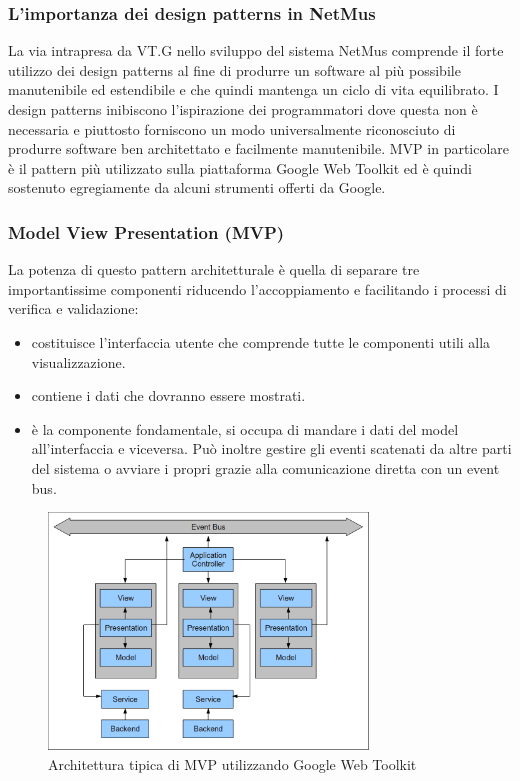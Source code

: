 \subsubsection{L'importanza dei design patterns in NetMus}
La via intrapresa da VT.G nello sviluppo del sistema NetMus comprende il forte
utilizzo dei design patterns al fine di produrre un software al pi\`u
possibile manutenibile ed estendibile e che quindi mantenga un ciclo di
vita equilibrato. 
I design patterns inibiscono l'ispirazione dei programmatori dove
questa non \`e necessaria e piuttosto forniscono un modo universalmente
riconosciuto di produrre software ben architettato e facilmente manutenibile.
MVP in particolare \`e il pattern pi\`u utilizzato sulla piattaforma Google Web
Toolkit ed \`e quindi sostenuto egregiamente da alcuni strumenti offerti da
Google.

\subsubsection{Model View Presentation (MVP) }
La potenza di questo pattern architetturale \`e quella di separare tre
importantissime componenti riducendo l'accoppiamento e facilitando i processi di
verifica e validazione:
\begin{itemize}
  \item{ }
  costituisce l'interfaccia utente che comprende tutte le componenti utili alla
  visualizzazione.
  \item{ }
  contiene i dati che dovranno essere mostrati. 
  \item{ }
  \`e la componente fondamentale, si occupa di mandare i dati del model
  all'interfaccia e viceversa. Pu\`o inoltre gestire gli eventi scatenati da
  altre parti del sistema o avviare i propri grazie alla comunicazione diretta
  con un event bus.

\end{itemize}    
\begin{figure}[!h]
\centering
\includegraphics[width=8.5cm]{img/ST/mvp.png}
\caption{Architettura tipica di MVP utilizzando Google Web Toolkit}
\end{figure}

